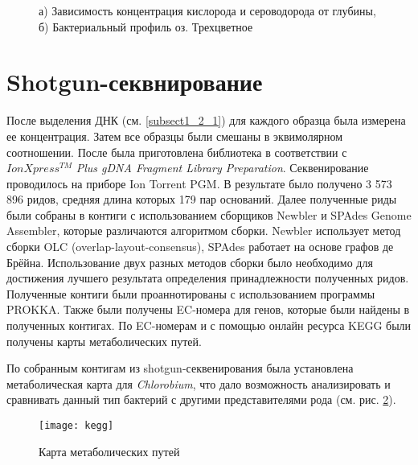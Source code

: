 \begin{figure}[h]
\begin{minipage}[h]{0.5\linewidth}
\end{minipage}
\hfill
\begin{minipage}[h]{0.5\linewidth}
\end{minipage}
\caption{а) Зависимость концентрация кислорода и сероводорода от глубины, б) Бактериальный профиль оз. Трехцветное}
\label{ris:concentr, 3cvet}
\end{figure}

\section{Shotgun-секвнирование}
После выделения ДНК (см. \ref{subsect1_2_1}) для каждого образца была измерена ее концентрация. Затем все образцы были смешаны в эквимолярном соотношении. После была приготовлена библиотека в соответствии с $IonXpress^{TM}$ \textit{Plus gDNA Fragment Library Preparation}. Секвенирование проводилось на приборе Ion Torrent PGM. В результате было получено 3 573 896 ридов, средняя длина которых 179 пар оснований. Далее полученные риды были собраны в контиги с использованием  сборщиков Newbler и SPAdes Genome Assembler, которые различаются алгоритмом сборки. Newbler использует метод сборки OLC (overlap-layout-consensus), SPAdes работает на основе графов де Брёйна. Использование двух разных методов сборки было необходимо для достижения лучшего результата определения принадлежности полученных ридов. Полученные контиги были проаннотированы с использованием программы PROKKA. Также были получены EC-номера для генов, которые были найдены в полученных контигах. По EC-номерам и с помощью онлайн ресурса KEGG были получены карты метаболических путей. 

По собранным контигам из shotgun-секвенирования была установлена метаболическая карта для \textit{Chlorobium}, что дало возможность анализировать и сравнивать данный тип бактерий с другими представителями рода (см. рис. \ref{img:kegg}). 

\begin{landscape}
\begin{figure}[h]
  \texttt{[image: kegg]}
  \centering
  \caption{Карта метаболических путей}
  \label{img:kegg}  
\end{figure}
\end{landscape}

